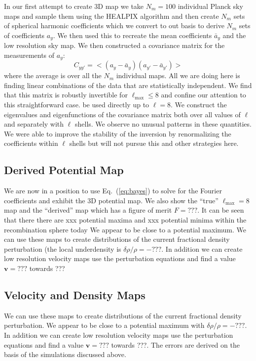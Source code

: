 \documentclass[useAMS,usenatbib,a4paper]{mn2e}
\begin{document}
In our first attempt to create 3D map we take $N_m=100$ individual
Planck sky maps and sample them using the HEALPIX algorithm and then
create $N_m$ sets of spherical harmonic coefficients which we convert
to out basis to derive $N_m$ sets of coefficients $a_y$. We then used
this to recreate the mean coefficients $\bar{a}_y$ and the low
resolution sky map. We then constructed a covariance matrix for the
measurements of $a_y$:
\begin{equation}
C_{yy'}=<(a_y-\bar{a}_y)(a_{y'}-\bar{a}_{y'})>
\end{equation}
where the average is over all the $N_m$ individual maps. All we are
doing here is finding linear combinations of the data that are
statistically independent. We find that this matrix is robustly
invertible for $\ell_\mathrm{max}\le8$ and confine our attention to
this straightforward case. be used directly up to $\ell=8$. We
construct the eigenvalues and eigenfunctions of the covariance matrix
both over all values of $\ell$ and separately with $\ell$ shells. We
observe no unusual patterns in these quantities. We were able to
improve the stability of the inversion by renormalizing the
coefficients within $\ell$ shells but will not pursue this and other
strategies here.

\subsection{Derived Potential Map}

We are now in a position to use Eq.~(\ref{eq:bayes}) to solve for the
Fourier coefficients and exhibit the 3D potential map. We also show
the ``true'' $\ell_\mathrm{max}=8$ map and the ``derived'' map which
has a figure of merit $F=???$.  It can be seen that there there are
xxx potential maxima and xxx potential minima within the recombination
sphere today We appear to be close to a potential maximum. We can use
these maps to create distributions of the current fractional density
perturbation (the local underdensity is $\delta\rho/\rho=-???$. In
addition we can create low resolution velocity maps use the
perturbation equations and find a value ${\mathbf v} =???$ towards ???

\subsection{Velocity and Density Maps}

We can use these maps to create distributions of the current
fractional density perturbation. We appear to be close to a potential
maximum with $\delta\rho/\rho=-???$. In addition we can create low
resolution velocity maps use the perturbation equations and find a
value ${\mathbf v} =???$ towards ???. The errors are derived on the
basis of the simulations discussed above.
\end{document}
